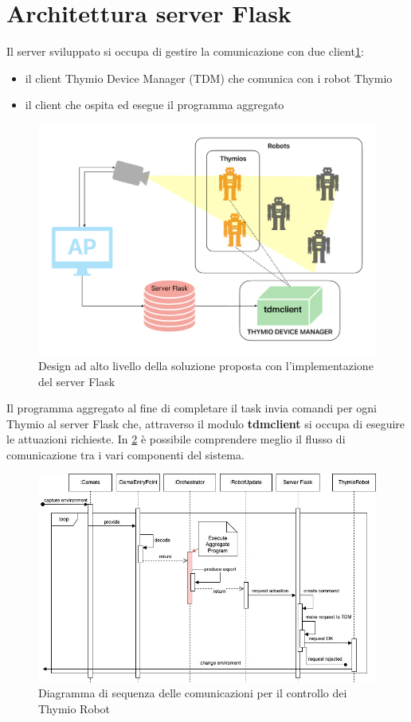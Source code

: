 \documentclass[12pt,a4paper,openright,twoside]{book}
\begin{document}
\section{Architettura server Flask}

Il server sviluppato si occupa di gestire la comunicazione con due client\cref{fig:server-arc}:
\begin{itemize}
    \item il client Thymio Device Manager (TDM) che comunica con i robot Thymio
    \item il client che ospita ed esegue il programma aggregato
\end{itemize}

\begin{figure}
    \centering
    \includegraphics[width=.8\linewidth]{figures/server-arc.pdf}
    \caption{Design ad alto livello della soluzione proposta con l'implementazione del server Flask}
    \label{fig:server-arc}
\end{figure}

Il programma aggregato al fine di completare il task invia comandi per ogni Thymio al server Flask che, attraverso il modulo \textbf{tdmclient} si occupa di eseguire le attuazioni richieste. In \cref{fig:sequence} è possibile comprendere meglio il flusso di comunicazione tra i vari componenti del sistema. 

\begin{figure}
    \centering
    \includegraphics[width=.99\linewidth,angle=90]{figures/sequence.jpg}
    \caption{Diagramma di sequenza delle comunicazioni per il controllo dei Thymio Robot}
    \label{fig:sequence}
\end{figure}
\end{document}
